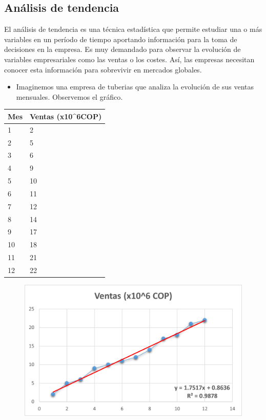 \documentclass{article}
\theoremstyle{mytheoremstyle}
\theoremstyle{mytheoremstyle}
\theoremstyle{myproblemstyle}
\begin{document}
\begin{enumerate}
\section{Análisis de tendencia}


El análisis de tendencia es una técnica estadística que permite estudiar una o más variables en un período de tiempo aportando información para la toma de decisiones en la empresa.
Es muy demandado para observar la evolución de variables empresariales como las ventas o los costes. Así, las empresas necesitan conocer esta información para sobrevivir en mercados globales.
\begin{itemize}
	\item  Imaginemos una empresa de tuberias que analiza la evolución de sus ventas mensuales. Observemos el gráfico.
\end{itemize}
\begin{table}[H]
    \centering
    \begin{tabular}{|l|l|}
    \hline
        Mes & Ventas (x10^{6}COP) \\ \hline
        1 & 2 \\ \hline
        2 & 5 \\ \hline
        3 & 6 \\ \hline
        4 & 9 \\ \hline
        5 & 10 \\ \hline
        6 & 11 \\ \hline
        7 & 12 \\ \hline
        8 & 14 \\ \hline
        9 & 17 \\ \hline
        10 & 18 \\ \hline
        11 & 21 \\ \hline
        12 & 22 \\ \hline
    \end{tabular}
\end{table}
\begin{figure}[H]
	\centering
	\includegraphics[width=\textwidth]{tendencia.png}

\end{figure}
\end{enumerate}
\end{document}
